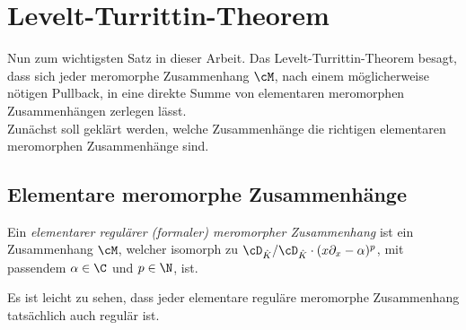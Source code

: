 \chapter{Levelt-\!Turrittin-\!Theorem}
Nun zum wichtigsten Satz in dieser Arbeit. Das Levelt-Turrittin-Theorem besagt,
dass sich jeder meromorphe Zusammenhang $\cM$, nach einem möglicherweise
nötigen Pullback, in eine direkte Summe von \glqq elementaren\grqq{}
meromorphen Zusammenhängen zerlegen lässt.\\
Zunächst soll geklärt werden, welche Zusammenhänge die \glqq richtigen\grqq{}
elementaren meromorphen Zusammenhänge sind.
\section{Elementare meromorphe Zusammenhänge}
\begin{defn}
Ein \emph{elementarer regulärer (formaler) meromorpher Zusammenhang} ist ein
Zusammenhang $\cM$, welcher isomorph zu $\cD_{\hat K}/\cD_{\hat K}\cdot
(x\partial_x-\alpha)^p$, mit passendem $\alpha\in \C$ und $p\in\N$, ist.
\end{defn}
\iffalse
\begin{figure}[htbp]
  \begin{center}
    \begin{tikzpicture}[scale=1,descr/.style={fill=white,inner sep=2.5pt}]
    \def\myPoints{}
    \def\myPath{ -- (3,0)}
    \myPlotFunction[nogrid]{\myPoints}{\myPath}{3}{0}{0}{
      $N((x\partial_x-\alpha)^p)$
    }

    \draw (3,0) -- (3,-.2);
    \node[below] at (3,-.2) {\footnotesize$p$};
    \end{tikzpicture}
  \end{center}
  \caption{Newton-Polygon zu Elementarem regulärem meromorphem Zusammenhang.}
\end{figure}
\fi
\begin{bem}
Es ist leicht zu sehen, dass jeder elementare reguläre meromorphe Zusammenhang
tatsächlich auch regulär ist.
\end{bem}


